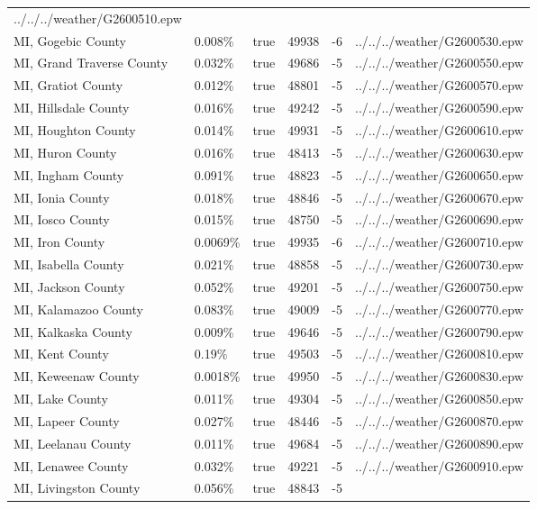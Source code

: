\begin{longtable}[]{@{}llllll@{}}
../../../weather/G2600510.epw \\
MI, Gogebic County & 0.008\% & true & 49938 & -6 &
../../../weather/G2600530.epw \\
MI, Grand Traverse County & 0.032\% & true & 49686 & -5 &
../../../weather/G2600550.epw \\
MI, Gratiot County & 0.012\% & true & 48801 & -5 &
../../../weather/G2600570.epw \\
MI, Hillsdale County & 0.016\% & true & 49242 & -5 &
../../../weather/G2600590.epw \\
MI, Houghton County & 0.014\% & true & 49931 & -5 &
../../../weather/G2600610.epw \\
MI, Huron County & 0.016\% & true & 48413 & -5 &
../../../weather/G2600630.epw \\
MI, Ingham County & 0.091\% & true & 48823 & -5 &
../../../weather/G2600650.epw \\
MI, Ionia County & 0.018\% & true & 48846 & -5 &
../../../weather/G2600670.epw \\
MI, Iosco County & 0.015\% & true & 48750 & -5 &
../../../weather/G2600690.epw \\
MI, Iron County & 0.0069\% & true & 49935 & -6 &
../../../weather/G2600710.epw \\
MI, Isabella County & 0.021\% & true & 48858 & -5 &
../../../weather/G2600730.epw \\
MI, Jackson County & 0.052\% & true & 49201 & -5 &
../../../weather/G2600750.epw \\
MI, Kalamazoo County & 0.083\% & true & 49009 & -5 &
../../../weather/G2600770.epw \\
MI, Kalkaska County & 0.009\% & true & 49646 & -5 &
../../../weather/G2600790.epw \\
MI, Kent County & 0.19\% & true & 49503 & -5 &
../../../weather/G2600810.epw \\
MI, Keweenaw County & 0.0018\% & true & 49950 & -5 &
../../../weather/G2600830.epw \\
MI, Lake County & 0.011\% & true & 49304 & -5 &
../../../weather/G2600850.epw \\
MI, Lapeer County & 0.027\% & true & 48446 & -5 &
../../../weather/G2600870.epw \\
MI, Leelanau County & 0.011\% & true & 49684 & -5 &
../../../weather/G2600890.epw \\
MI, Lenawee County & 0.032\% & true & 49221 & -5 &
../../../weather/G2600910.epw \\
MI, Livingston County & 0.056\% & true & 48843 & -5 &

\end{longtable}
